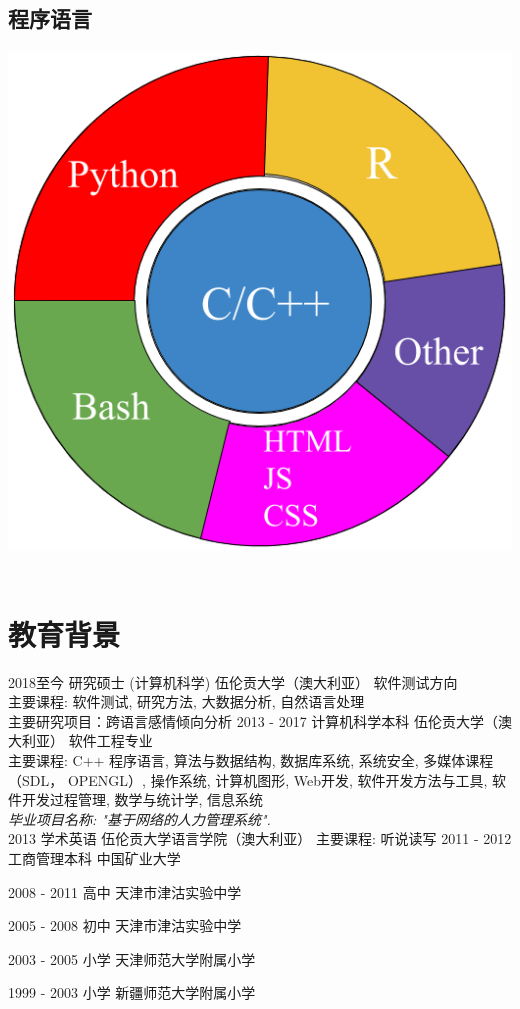 \documentclass[]{friggeri-cv}
\begin{document}
\begin{aside}
  \section{程序语言}
    \includegraphics[scale=0.2]{img/programming.png}
    ~
\end{aside}

\section{教育背景}
\begin{entrylist}
  \entry
    {2018至今}
    {研究硕士 (计算机科学)}
    {伍伦贡大学（澳大利亚）}
    {软件测试方向\\
    主要课程: 软件测试, 研究方法, 大数据分析, 自然语言处理\\
    主要研究项目：跨语言感情倾向分析}
  \entry
    {2013 - 2017}
    {计算机科学本科​}
    {伍伦贡大学（澳大利亚）}
    {软件工程专业\\
    主要课程: C++ 程序语言, 算法与数据结构, 数据库系统, 系统安全, 多媒体课程（SDL， OPENGL）, 操作系统, 计算机图形, Web开发, 软件开发方法与工具, 软件开发过程管理, 数学与统计学, 信息系统\\
    \emph{毕业项目名称: "基于网络的人力管理系统".}\\}
  \entry
    {2013}
    {学术英语}
    {伍伦贡大学语言学院（澳大利亚）}
    {主要课程: 听说读写}
  \entry
    {2011 - 2012}
    {工商管理本科}
    {中国矿业大学}
    
  \entry
    {2008 - 2011}
    {高中}
    {天津市津沽实验中学}
    {}
    
  \entry
    {2005 - 2008}
    {初中}
    {天津市津沽实验中学}
    
  \entry
    {2003 - 2005}
    {小学}
    {天津师范大学附属小学} 
    
  \entry
    {1999 - 2003}
    {小学}
    {新疆师范大学附属小学}  
    
\end{entrylist}
\newpage
\end{document}
